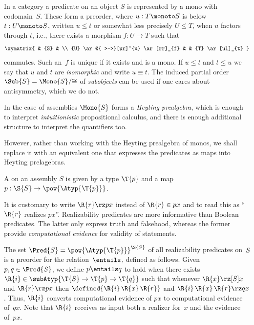 In a category a predicate on an object $S$ is represented by a mono with codomain~$S$. These form a preorder, where $u : T \monoto S$ is below $t : U \monoto S$, written $u \leq t$ or somewhat less precisely $U \leq T$, when $u$ factors through $t$, i.e., there exists a morphism $f : U \to T$ such that
%
\begin{equation*}
  \xymatrix{
    &
    {S}
    &
    \\
    {U}
    \ar@{ >->}[ur]^{u}
    \ar[rr]_{f}
    &
    &
    {T}
    \ar[ul]_{t}
  }
\end{equation*}
%
commutes. Such an~$f$ is unique if it exists and is a mono. If $u \leq t$ and $t \leq u$ we say that $u$ and $t$ are \emph{isomorphic} and write $u \equiv t$. The induced partial order $\Sub{S} = \Mono{S}/{\cong}$ of \emph{subobjects} can be used if one cares about antisymmetry, which we do not.

In the case of assemblies $\Mono{S}$ forms a \emph{Heyting prealgebra}, which is enough to interpret \emph{intuitionistic} propositional calculus, and there is enough additional structure to interpret the quantifiers too.
%

However, rather than working with the Heyting prealgebra of monos, we shall replace it with an equivalent one that expresses the predicates as maps into Heyting prelagebras.

\begin{definition}
  A  on an assembly $S$ is given by a type $\T{p}$ and a
  map $p : \S{S} \to \pow{\Atyp{\T{p}}}$.
\end{definition}

It is customary to write $\R{r} \rz p x$ instead of $\R{r} \in p x$ and to read this as ``$\R{r}$ realizes $p x$''. Realizability predicates are more informative than Boolean predicates. The latter only express truth and falsehood, whereas the former provide \emph{computational evidence} for validity of statements.

The set $\Pred{S} = \pow{\Atyp{\T{p}}}^{\S{S}}$ of all realizability predicates on~$S$ is a preorder for the  relation~$\entails$, defined as follows. Given  $p, q \in \Pred{S}$, we define $p \entails q$ to hold when there exists $\R{i} \in \subAtyp{\T{S} \to \T{p} \to \T{q}}$ such that whenever $\R{x} \rz[S] x$ and $\R{r} \rz p x$ then $\defined{\R{i}\,\R{x}\,\R{r}}$ and $\R{i}\,\R{x}\,\R{r} \rz q x$.
Thus, $\R{i}$ converts computational evidence of $p x$ to computational evidence of~$q x$. Note that $\R{i}$ receives as input both a realizer for~$x$ and the evidence of~$p x$.


